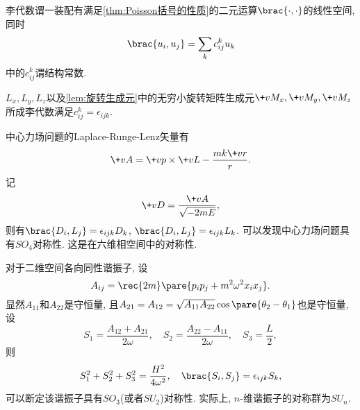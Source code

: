 \documentclass[../TheoreticalMechanics.tex]{subfiles}
\begin{document}
\begin{definition}[李代数]
    李代数谓一装配有满足\cref{thm:Poisson括号的性质}的二元运算$\brac{\cdot,\cdot}$的线性空间, 同时
    \[ \brac{u_i,u_j} = \sum_k c_{ij}^k u_k \]
    中的$c_{ij}^k$谓结构常数.
\end{definition}
\begin{ex}
    $L_x,L_y,L_z$以及\cref{lem:旋转生成元}中的无穷小旋转矩阵生成元$\+vM_x,\+vM_y,\+vM_z$所成李代数满足$c_{ij}^k=\epsilon_{ijk}$.
\end{ex}
\begin{ex}
    中心力场问题的Laplace-Runge-Lenz矢量有
    \[ \+vA = \+vp\times\+vL - \frac{mk\+vr}{r}. \]
    记
    \[ \+vD = \frac{\+vA}{\sqrt{-2mE}}, \]
    则有$\brac{D_i,L_j}=\epsilon_{ijk}D_k$, $\brac{D_i,L_j}=\epsilon_{ijk}L_k$. 可以发现中心力场问题具有$SO_4$对称性. 这是在六维相空间中的对称性.
\end{ex}
\begin{ex}
    对于二维空间各向同性谐振子, 设
    \[ A_{ij} = \rec{2m}\pare{p_ip_j + m^2\omega^2x_ix_j}. \]
    显然$A_{11}$和$A_{22}$是守恒量, 且$A_{21}=A_{12}=\sqrt{A_{11}A_{22}}\cos\pare{\theta_2-\theta_1}$也是守恒量, 设
    \[ S_1 = \frac{A_{12}+A_{21}}{2\omega},\quad S_2 = \frac{A_{22}-A_{11}}{2\omega},\quad S_3 = \frac{L}{2}, \]
    则
    \[ S_1^2 + S_2^2 + S_3^2 = \frac{H^2}{4\omega^2},\quad \brac{S_i,S_j} = \epsilon_{ijk}S_k, \]
    可以断定该谐振子具有$SO_3$(或者$SU_2$)对称性. 实际上, $n$-维谐振子的对称群为$SU_n$.
\end{ex}



\end{document}
